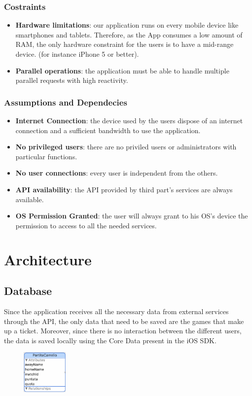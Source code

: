 \documentclass[numbers=noenddot, 12pt, a4paper, oneside]{scrbook}
\begin{document}
\subsection*{Costraints}

\begin{itemize}
	\item \textbf{Hardware limitations}: our application runs on every mobile device like smartphones and tablets. Therefore, as the App consumes a low amount of RAM, the only hardware constraint for the users is to have a mid-range device. (for instance iPhone 5 or better).
	\item \textbf{Parallel operations}: the application must be able to handle multiple parallel requests with high reactivity.
\end{itemize}

\subsection*{Assumptions and Dependecies}
\begin{itemize}
	\item \textbf{Internet Connection}: the device used by the users dispose of an internet connection and a sufficient bandwidth to use the application.
	\item \textbf{No privileged users}: there are no priviled users or administrators with particular functions.
	\item \textbf{No user connections}: every user is independent from the others.
	\item \textbf{API availability}: the API provided by third part's services are always available.
	\item \textbf{OS Permission Granted}: the user will always grant to his OS's device the permission to access to all the needed services.
\end{itemize}


\chapter{Architecture}
\section{Database}
Since the application receives all the necessary data from external services through the API, the only data that need to be saved are the games that make up a ticket. Moreover, since there is no interaction between the different users, the data is saved locally using the Core Data present in the iOS SDK.
\begin{figure}[H]
	\centering
	\includegraphics[width=0.2\textwidth]{images/DatiSchedina}
\end{figure}
\end{document}
